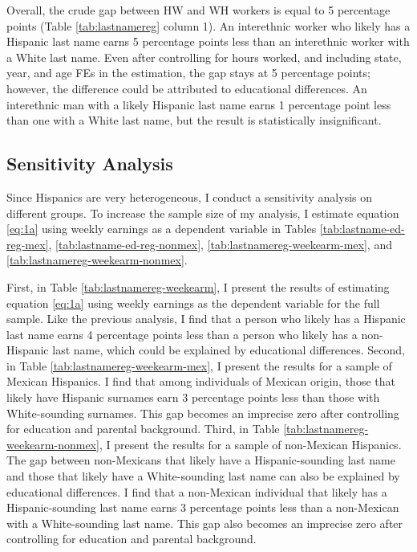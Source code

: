 Overall, the crude gap between HW and WH workers is equal to 5 percentage points (Table \ref{tab:lastnamereg} column 1). An interethnic worker who likely has a Hispanic last name earns 5 percentage points less than an interethnic worker with a White last name. Even after controlling for hours worked, and including state, year, and age FEs in the estimation, the gap stays at 5 percentage points; however, the difference could be attributed to educational differences. An interethnic man with a likely Hispanic last name earns 1 percentage point less than one with a White last name, but the result is statistically insignificant.


\subsection{Sensitivity Analysis}

Since Hispanics are very heterogeneous, I conduct a sensitivity analysis on different groups. To increase the sample size of my analysis, I estimate equation \ref{eq:1a} using weekly earnings as a dependent variable in Tables \ref{tab:lastname-ed-reg-mex}, \ref{tab:lastname-ed-reg-nonmex}, \ref{tab:lastnamereg-weekearm-mex}, and \ref{tab:lastnamereg-weekearm-nonmex}. 

First, in Table \ref{tab:lastnamereg-weekearm}, I present the results of estimating equation \ref{eq:1a} using weekly earnings as the dependent variable for the full sample. Like the previous analysis, I find that a person who likely has a Hispanic last name earns 4 percentage points less than a person who likely has a non-Hispanic last name, which could be explained by educational differences. Second, in Table \ref{tab:lastnamereg-weekearm-mex}, I present the results for a sample of Mexican Hispanics. I find that among individuals of Mexican origin, those that likely have Hispanic surnames earn 3 percentage points less than those with White-sounding surnames. This gap becomes an imprecise zero after controlling for education and parental background. Third, in Table \ref{tab:lastnamereg-weekearm-nonmex}, I present the results for a sample of non-Mexican Hispanics. The gap between non-Mexicans that likely have a Hispanic-sounding last name and those that likely have a White-sounding last name can also be explained by educational differences. I find that a non-Mexican individual that likely has a Hispanic-sounding last name earns 3 percentage points less than a non-Mexican with a White-sounding last name. This gap also becomes an imprecise zero after controlling for education and parental background.

